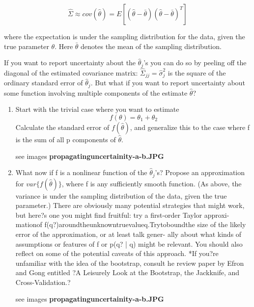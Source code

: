 \documentclass{homework}
\begin{document}
$$\hat{\Sigma} \approx cov(\hat{\theta})= E[ (\hat{\theta} - \bar{\theta})(\hat{\theta} - \bar{\theta})^T]$$

where the expectation is under the sampling distribution for the data, given the true parameter $\theta$. Here $\bar{\theta}$ denotes the mean of the sampling distribution.
\par If you want to report uncertainty about the $\hat{\theta}_j$'s you can do so by peeling off the diagonal of the estimated covariance matrix: $\hat{\Sigma}_{jj} = \hat{\sigma}_j^2$ is the square of the ordinary standard error of $\hat{\theta}_j$. But what if you want to
report uncertainty about some function involving multiple components of the estimate $\hat{\theta}$?
\begin{enumerate}[label=(\Alph*)]

\item Start with the trivial case where you want to estimate 
$$f(\theta) = \theta_1 + \theta_2$$ 
Calculate the standard error of $f(\hat{\theta})$, and generalize this to the case where f is the sum of all p components of $\hat{\theta}$.

\par * see images \textbf{propagatinguncertainity-a-b.JPG}

\item What now if f is a nonlinear function of the $\hat{\theta}_j$'s? Propose an approximation for $var\{ f(\hat{\theta} )\}$, where f is any sufficiently smooth function. (As above, the variance is under the sampling distribution of the data, given the true parameter.)
There are obviously many potential strategies that might work, but here?s one you might find fruitful: try a first-order Taylor approxi- mationof f(q?)aroundtheunknowntruevalueq.Trytoboundthe size of the likely error of the approximation, or at least talk gener- ally about what kinds of assumptions or features of f or p(q? | q) might be relevant. You should also reflect on some of the potential caveats of this approach.  
*If you?re unfamiliar with the idea of the bootstrap, consult he review paper by Efron and Gong entitled ?A Leisurely Look at the Bootstrap, the Jackknife, and Cross-Validation.?  

\par * see images \textbf{propagatinguncertainity-a-b.JPG}
\end{enumerate}
\end{document}

